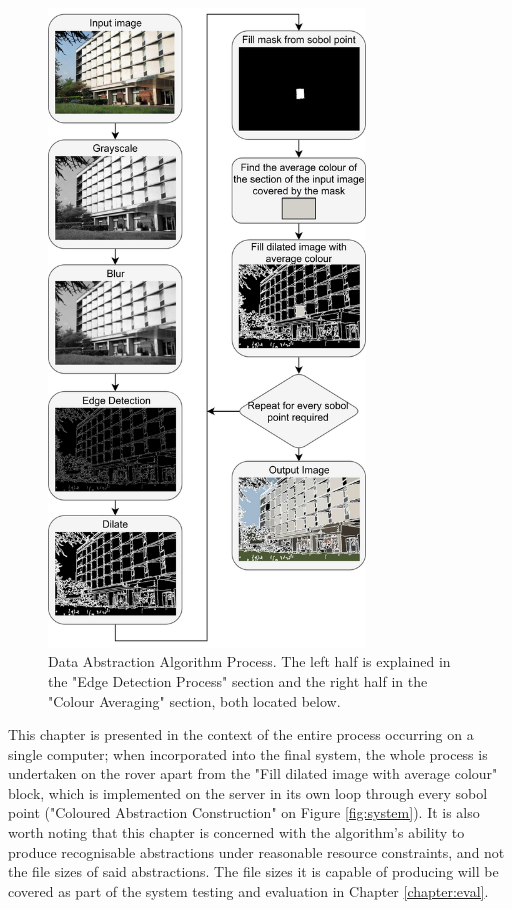 \begin{figure}[H]
    \begin{center}
      \includegraphics[width=0.75\textwidth]{Figures/Abstraction.jpg}
      \caption[Data Abstraction Algorithm Process]{Data Abstraction Algorithm Process. The left half is explained in the "Edge Detection Process" section and the right half in the "Colour Averaging" section, both located below.}
      \label{fig:process}
    \end{center}
\end{figure}

This chapter is presented in the context of the entire process occurring on a single computer; when incorporated into the final system, the whole process is undertaken on the rover apart from the "Fill dilated image with average colour" block, which is implemented on the server in its own loop through every sobol point ("Coloured Abstraction Construction" on Figure \ref{fig:system}). It is also worth noting that this chapter is concerned with the algorithm's ability to produce recognisable abstractions under reasonable resource constraints, and not the file sizes of said abstractions. The file sizes it is capable of producing will be covered as part of the system testing and evaluation in Chapter \ref{chapter:eval}.

